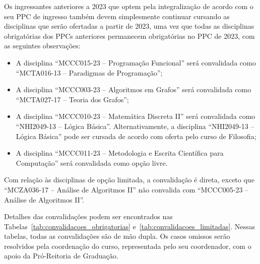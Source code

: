 \documentclass[a4paper]{article}
\begin{document}
Os ingressantes anteriores a 2023 que optem pela integralização de acordo com o
seu PPC de ingresso também devem simplesmente continuar cursando as disciplinas
que serão ofertadas a partir de 2023, uma vez que todas as disciplinas
obrigatórias dos PPCs anteriores permanecem obrigatórias no PPC de 2023, com as
seguintes observações:
\begin{itemize}
    \item A disciplina ``MCCC015-23 -- Programação Funcional'' será convalidada
    como ``MCTA016-13 -- Paradigmas de Programação'';
    \item A disciplina ``MCCC003-23 -- Algoritmos em Grafos'' será convalidada
    como ``MCTA027-17 -- Teoria dos Grafos'';
    \item A disciplina ``MCCC010-23 -- Matemática Discreta II'' será
    convalidada como ``NHI2049-13 -- Lógica Básica''.  Alternativamente, a
    disciplina ``NHI2049-13 -- Lógica Básica'' pode ser cursada de acordo com
    oferta pelo curso de Filosofia;
    \item A disciplina ``MCCC011-23 -- Metodologia e Escrita Científica para
    Computação'' será convalidada como opção livre.
\end{itemize}
Com relação às disciplinas de opção limitada, a convalidação é direta, exceto
que ``MCZA036-17 -- Análise de Algoritmos II'' não convalida com
``MCCC005-23 -- Análise de Algoritmos II''.

Detalhes das convalidações podem ser encontrados nas
Tabelas~\ref{tab:convalidacoes_obrigatorias}
e~\ref{tab:convalidacoes_limitadas}. Nessas tabelas, todas as
convalidações são de mão dupla.
Os casos omissos serão resolvidos pela coordenação do curso, representada pelo
seu coordenador, com o apoio da Pró-Reitoria de Graduação.


\newpage
\end{document}
